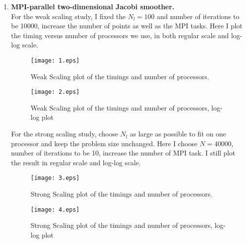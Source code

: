 \documentclass[12pt]{article}
\begin{document}
\begin{enumerate}
\item {\bf MPI-parallel two-dimensional Jacobi smoother.} \\
For the weak scaling study, I fixed the $N_l = 100$ and number of iterations to be 10000, increase the number of points as well as the MPI tasks. Here I plot the timing versus number of processors we use, in both regular scale and log-log scale.
\begin{figure}[h]
            \centering
            \texttt{[image: 1.eps]}
            \caption{Weak Scaling plot of the timings and number of processors.}
            \label{fig:f1}
\end{figure}
\begin{figure}[h]
            \centering
            \texttt{[image: 2.eps]}
            \caption{Weak Scaling plot of the timings and number of processors, log-log plot}
            \label{fig:f2}
\end{figure}

For the strong scaling study, choose $N_l$ as large as possible to fit on one processor and keep the problem size unchanged. Here I choose $N=40000$, number of iterations to be 10, increase the number of MPI task. I still plot the result in regular scale and log-log scale.
\begin{figure}[h]
            \centering
            \texttt{[image: 3.eps]}
            \caption{Strong Scaling plot of the timings and number of processors.}
            \label{fig:f3}
\end{figure}
\begin{figure}[h]
            \centering
            \texttt{[image: 4.eps]}
            \caption{Strong Scaling plot of the timings and number of processors, log-log plot}
            \label{fig:f4}
\end{figure}



\end{enumerate}
\end{document}
